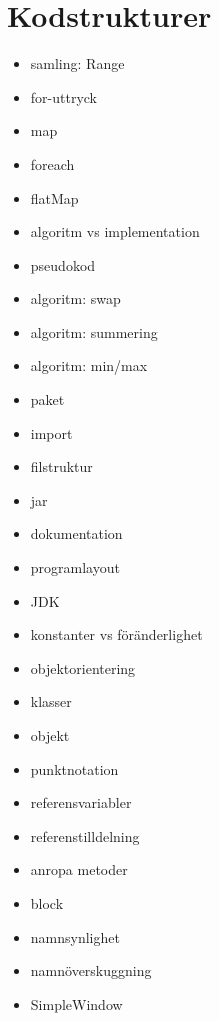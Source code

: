 \chapter{Kodstrukturer}\label{chapter:W02}
\begin{itemize}[nosep]
\item samling: Range
\item for-uttryck
\item map
\item foreach
\item flatMap
\item algoritm vs implementation
\item pseudokod
\item algoritm: swap
\item algoritm: summering
\item algoritm: min/max
\item paket
\item import
\item filstruktur
\item jar
\item dokumentation
\item programlayout
\item JDK
\item konstanter vs föränderlighet
\item objektorientering
\item klasser
\item objekt
\item punktnotation
\item referensvariabler
\item referenstilldelning
\item anropa metoder
\item block
\item namnsynlighet
\item namnöverskuggning
\item SimpleWindow
\end{itemize}